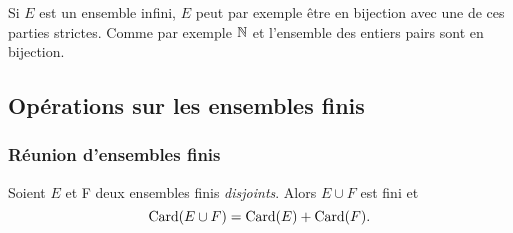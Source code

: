 Si $E$ est un ensemble infini, $E$ peut par exemple être en bijection avec une de ces parties strictes. Comme par exemple $\mathbb{N}$ et l'ensemble des entiers pairs sont en bijection.

\subsection{Opérations sur les ensembles finis}

\subsubsection{Réunion d'ensembles finis}

\begin{prop}\label{prop:reunionfindis}
  Soient $E$ et F deux ensembles finis \emph{disjoints}. Alors $E\cup F$ est fini et 
  \begin{equation}
    \operatorname{Card}(E\cup F)=\operatorname{Card}(E)+\operatorname{Card}(F).
  \end{equation}
\end{prop}


